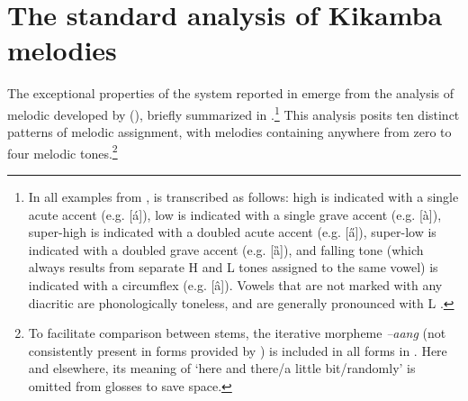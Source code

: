 \documentclass[output=paper,newtxmath,modfonts,nonflat,hidelinks]{langsci/langscibook}
\begin{document}
\section{The standard analysis of Kikamba melodies \citep{Roberts-Kohno2014}}

The exceptional properties of the   system reported in  emerge from the analysis of  melodic  developed by \citeauthor{Roberts-Kohno2000} (\citeyear{Roberts-Kohno2000,Roberts-Kohno2014}), briefly summarized in .\footnote{In all examples from ,  is transcribed as follows: high  is indicated with a single acute accent (e.g. [á]), low  is indicated with a single grave accent (e.g. [à]), super-high  is indicated with a doubled acute accent (e.g. [\H{a}]),  super-low  is indicated with a doubled grave accent (e.g. [ȁ]),
and falling tone (which always results from separate H and L tones assigned to the same vowel) is indicated with a circumflex (e.g. [â]).
Vowels that are not marked with any diacritic are phonologically toneless, and are generally pronounced with L .} This analysis posits ten distinct patterns of melodic  assignment, with melodies containing anywhere from zero to four melodic tones.\footnote{To facilitate comparison between stems, the iterative morpheme \textit{–aang} (not consistently present in forms provided by \citealt{Roberts-Kohno2014}) is included in all forms in . Here and elsewhere, its meaning of ‘here and there/a little bit/randomly’ is omitted from glosses to save space.}
\end{document}
